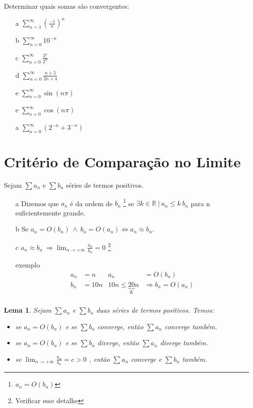 \documentclass[12pt,openany, letterpaper]{book}
\newtheorem{lemma}{Lema}[section]
\begin{document}
Determinar quais somas são convergentes:
\begin{itemize}
\item [a] $\displaystyle{\sum_{n = 1}^{\infty} \left(\frac{-1}{n}\right)^n}$
\item [b] $\displaystyle{\sum_{n = 0}^{\infty} 10^{-n} }$
\item [c] $\displaystyle{\sum_{n = 0}^{\infty} \frac{3^n}{2^n}}$
\item [d] $\displaystyle{\sum_{n = 0}^{\infty} \frac{n+5}{2n+4}}$
\item [e] $\displaystyle{\sum_{n = 0}^{\infty} \sin (n\pi)}$
\item [e] $\displaystyle{\sum_{n = 0}^{\infty} \cos (n\pi)}$
\item [a] $\displaystyle{\sum_{n = 0}^{\infty}  (2^{-n} + 3^{-n})}$
\end{itemize}

\section{Critério de Comparação no Limite}
\label{sec:s29}
Sejam $\sum a_n$ e $\sum b_n$ séries de termos positivos.
\begin{itemize}
\item [a] Dizemos que $a_n$ é da ordem de $b_n$ \footnote{$a_n = O(b_n)$} se $\exists k \in \mathds{R}\ |\ a_n \leq k\ b_n$ para n suficientemente grande.
\item [b]  Se $a_n = O(b_n) \ \land \ b_n = O(a_n) \Longleftrightarrow a_n\approx b_n$.
\item [c] $\displaystyle{a_n\approx b_n \ \Rightarrow \lim_{n \rightarrow +\infty} \frac{a_n}{b_n} = 0}$ \footnote{Verificar esse detalhe}
\item [exemplo] 
\begin{align*}
a_n &= n    &    a_n &= O(b_n) \\
b_n &= 10n  &   10n \leq \underbrace{20}_K n &\Rightarrow b_n = O(a_n) \\
\end{align*}
\end{itemize}

\begin{lemma}
Sejam $\sum a_n$ e $\sum b_n$ duas séries de termos positivos. Temos:\begin{itemize}
\item se $a_n = O(b_n)$ e se $\sum b_n$ converge, então $\sum a_n$ converge também.
\item se $a_n = O(b_n)$ e se $\sum b_n$ diverge, então $\sum a_n$ diverge também.
\item se $\displaystyle{\lim_{n \rightarrow +\infty} \frac{a_n}{b_n} = c > 0}$ , então $\sum a_n$ converge e $\sum b_n$ também.
\end{itemize}
\end{lemma}
\end{document}
